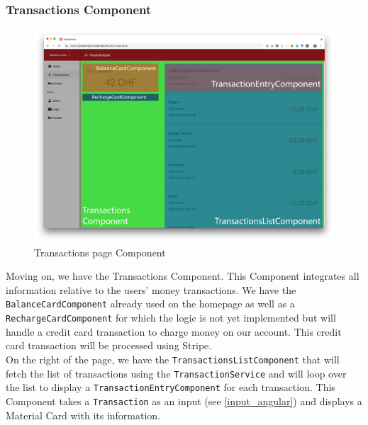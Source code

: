 \documentclass[twoside, openright,11pt,a4paper]{book}
\begin{document}
\subsubsection{Transactions Component}
\label{transactions_component_impl}
\begin{figure}[H]
\begin{center}
	\includegraphics[width=\textwidth]{assets/screens/angular/transactions}
	\caption{Transactions page Component}
			\label{transactions_screen}
\end{center}
\end{figure}
Moving on, we have the Transactions Component. This Component integrates all information relative to the users' money transactions. We have the \verb+BalanceCardComponent+ already used on the homepage as well as a \\\verb+RechargeCardComponent+ for which the logic is not yet implemented but will handle a credit card transaction to charge money on our account. This credit card transaction will be processed using Stripe\cite{stripe:website}.\\

On the right of the page, we have the \verb+TransactionsListComponent+ that will fetch the list of transactions using the \verb+TransactionService+ and will loop over the list to display a \verb+TransactionEntryComponent+ for each transaction. This Component takes a \verb+Transaction+ as an input (see \ref{input_angular}) and displays a Material Card\cite{angular:material:component:card} with its information.
\end{document}
